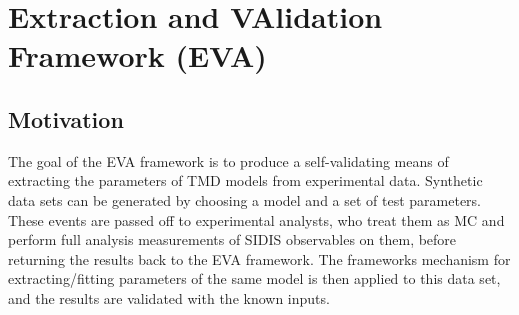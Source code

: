 %
%
%

\chapter{Extraction and VAlidation Framework (EVA)}
 
 \section{Motivation}
The goal of the EVA framework is to produce a self-validating means of extracting the parameters of TMD models from experimental data.  Synthetic data sets can be generated by choosing a model and a set of test parameters.  These events are passed off to experimental analysts, who treat them as MC and perform full analysis measurements of SIDIS observables on them, before returning the results back to the EVA framework.  The frameworks mechanism for extracting/fitting parameters of the same model is then applied to this data set, and the results are validated with the known inputs.  